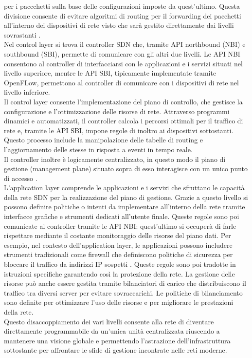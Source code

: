 per i paccchetti sulla base delle configurazioni imposte da quest'ultimo. 
Questa divisione consente di evitare algoritmi
di routing per il forwarding dei pacchetti all'interno dei dispositivi di rete visto che sarà
gestito direttamente dai livelli sovrastanti \cite{tesiSDN:2017}. 
\\Nel control layer si trova il controller SDN che, tramite API northbound (NBI) e southbound (SBI), permette di comunicare con
gli altri due livelli. Le API NBI consentono al controller di interfacciarsi con le applicazioni e i servizi situati nel livello superiore,
mentre le API SBI, tipicamente implementate tramite OpenFLow, permettono al controller di comunicare con i dispositivi di rete nel livello inferiore.
\\Il control layer consente l'implementazione del piano di controllo, che gestisce la configurazione e l'ottimizzazione delle risorse di rete. 
Attraverso programmi dinamici e automatizzati, il controller calcola i percorsi ottimali per il traffico di rete e, tramite le API SBI, impone regole di inoltro ai dispositivi sottostanti. 
Questo processo include la manipolazione delle tabelle di routing e l'aggiornamento delle stesse in risposta a eventi in tempo reale.
\\Il controller inoltre è logicamente centralizzato, in questo modo il piano di gestione (management plane) situato sopra di esso interagisce con un
unico punto di accesso \cite{tesiSDN:2020}.
\\L'application layer comprende le applicazioni e i servizi che sfruttano le capacità della
rete SDN per la realizzazione del piano di gestione. Grazie a questo livello si possono
definire politiche o intenti da implementare all'interno della rete tramite interfacce grafiche e strumenti dedicati all'utente finale.
Queste regole sono poi comunicate al
controller tramite le API NBI: quest'ultimo si occuperà di farle rispettare mediante il costante monitoraggio delle risorse del piano dati. 
Per esempio, nel contesto dell'application layer, le applicazioni possono includere strumenti tradizionali come firewall che definiscono politiche di sicurezza per bloccare il traffico da indirizzi IP sospetti \cite{appl}. 
Queste regole sono poi tradotte in istruzioni specifiche garantendo così la protezione della rete.
La gestione delle risorse può anche essere gestita tramite bilanciatori di carico che distribuiscono il traffico tra diversi server per evitare sovraccarichi.
Le politiche di bilanciamento sono definite per ottimizzare l'uso delle risorse e per migliorare le prestazioni della rete. 
\\Questo disaccoppiamento dei vari livelli consente alla rete di diventare direttamente programmabile da un'unica unità
centralizzata riuscendo a mantenere una visione globale e permettendo l'astrazione dell'infrastruttura sottostante per affrontare le sfide 
di gestione incontrate nelle reti moderne.


